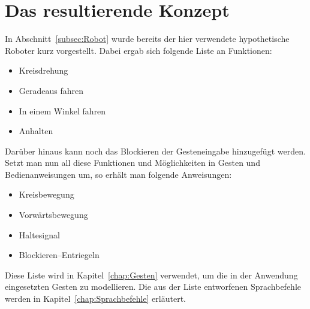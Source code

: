 \section{Das resultierende Konzept}
\label{subsec:Konzept}
In Abschnitt~\ref{subsec:Robot} wurde bereits der hier verwendete hypothetische Roboter kurz vorgestellt. Dabei ergab sich folgende Liste an Funktionen:
\begin{itemize}
\item Kreisdrehung
\item Geradeaus fahren
\item In einem Winkel fahren
\item Anhalten
\end{itemize}
Dar\"uber hinaus kann noch das Blockieren der Gesteneingabe hinzugef\"ugt werden. Setzt man nun all diese Funktionen und M\"oglichkeiten in Gesten und Bedienanweisungen um, so erh\"alt man folgende Anweisungen:
\begin{itemize}
\item Kreisbewegung
\item Vorw\"artsbewegung
\item Haltesignal
\item Blockieren--Entriegeln
\end{itemize}
Diese Liste wird in Kapitel~\ref{chap:Gesten} verwendet, um die in der Anwendung eingesetzten Gesten zu modellieren.
\newline
Die aus der Liste entworfenen Sprachbefehle werden in Kapitel~\ref{chap:Sprachbefehle} erl\"autert.